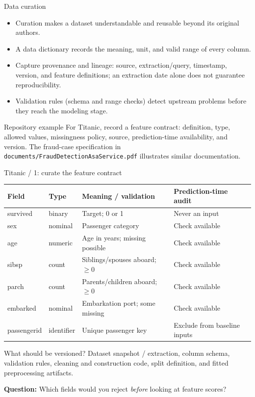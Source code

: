\begin{frame}{Data curation}
\begin{itemize}
\item Curation makes a dataset understandable and reusable beyond its original authors.
\item A data dictionary records the meaning, unit, and valid range of every column.
\item Capture provenance and lineage: source, extraction/query, timestamp, version, and feature definitions; an extraction date alone does not guarantee reproducibility.
\item Validation rules (schema and range checks) detect upstream problems before they reach the modeling stage.
\end{itemize}
\begin{block}{Repository example}
For Titanic, record a feature contract: definition, type, allowed values, missingness policy, source, prediction-time availability, and version. The fraud-case specification in \texttt{documents/FraudDetectionAsaService.pdf} illustrates similar documentation.
\end{block}
\coursefooter
\end{frame}
\begin{frame}{Titanic / 1: curate the feature contract}
\small
\begin{tabularx}{\textwidth}{>{\ttfamily}l l X X}
\normalfont\bfseries Field & \bfseries Type & \bfseries Meaning / validation & \bfseries Prediction-time audit \\
\toprule
survived & binary & Target; 0 or 1 & Never an input \\
sex & nominal & Passenger category & Check available \\
age & numeric & Age in years; missing possible & Check available \\
sibsp & count & Siblings/spouses aboard; $\ge 0$ & Check available \\
parch & count & Parents/children aboard; $\ge 0$ & Check available \\
embarked & nominal & Embarkation port; some missing & Check available \\
passengerid & identifier & Unique passenger key & Exclude from baseline inputs \\
\bottomrule
\end{tabularx}
\vspace{0.5em}
\begin{block}{What should be versioned?}
\small Dataset snapshot / extraction, column schema, validation rules, cleaning and construction code, split definition, and fitted preprocessing artifacts.
\end{block}
\textbf{Question:} Which fields would you reject \emph{before} looking at feature scores?
\coursefooter
\end{frame}
